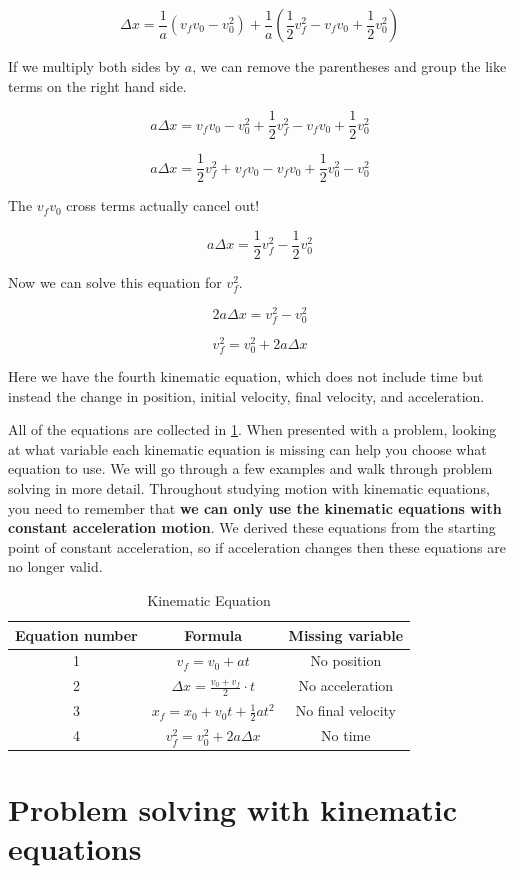 \documentclass[12pt]{book}
\begin{document}
\begin{equation}
\Delta x = \frac{1}{a} (v_f v_0 - v_0^2) + \frac{1}{a} (\frac{1}{2} v_f^2 - v_f v_0 + \frac{1}{2} v_0^2)
\end{equation}

If we multiply both sides by $a$, we can remove the parentheses and group the like terms on the right hand side.

\begin{equation}
a \Delta x = v_f v_0 - v_0^2 + \frac{1}{2} v_f^2 - v_f v_0 + \frac{1}{2} v_0^2
\end{equation}

\begin{equation}
a \Delta x = \frac{1}{2} v_f^2 + v_f v_0 - v_f v_0 + \frac{1}{2} v_0^2 - v_0^2
\end{equation}

The $v_f v_0$ cross terms actually cancel out!

\begin{equation}
a \Delta x = \frac{1}{2} v_f^2 - \frac{1}{2} v_0^2
\end{equation}

Now we can solve this equation for $v_f^2$.

\begin{equation}
2 a \Delta x	 = v_f^2 - v_0^2
\end{equation}

\begin{equation}
v_f^2 = v_0^2 + 2 a \Delta x
\label{km4}
\end{equation}

Here we have the fourth kinematic equation, which does not include time but instead the change in position, initial velocity, final velocity, and acceleration.

All of the equations are collected in \ref{kmtable}. When presented with a problem, looking at what variable each kinematic equation is missing can help you choose what equation to use. We will go through a few examples and walk through problem solving in more detail. Throughout studying motion with kinematic equations, you need to remember that \textbf{we can only use the kinematic equations with constant acceleration motion}. We derived these equations from the starting point of constant acceleration, so if acceleration changes then these equations are no longer valid. 

\begin{table}[b]
\large
\centering
\caption{Kinematic Equation}
\label{kmtable}
\begin{tabular}{| c | c | c |}
	\hline
	Equation number & Formula & Missing variable \\
	\hline
	1 & $v_f = v_0 + at$ & No position \\[5pt] \hline
	2 & $\Delta x = \frac{v_0 + v_f}{2} \cdot t$ & No acceleration \\[5pt] \hline
	3 & $x_f = x_0 + v_0 t + \frac{1}{2} a t^2$ & No final velocity \\[5pt] \hline
	4 & $v_f^2 = v_0^2 + 2 a \Delta x$ & No time \\[5pt]
	\hline
\end{tabular}
\end{table}

\newpage

\section{Problem solving with kinematic equations}
\end{document}
